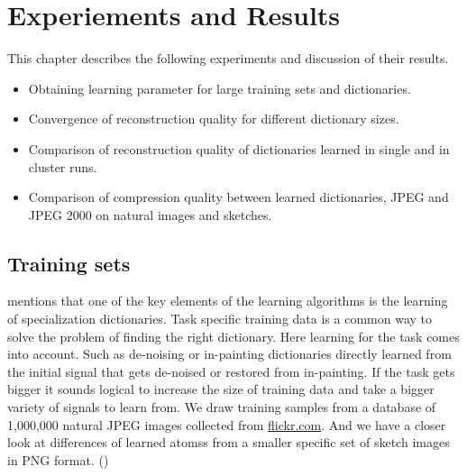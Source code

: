 \chapter{Experiements and Results}

This chapter describes the following experiments and discussion of their
results.
\begin{itemize}
 \item Obtaining learning parameter for large training sets and dictionaries.
 \item Convergence of reconstruction quality for different dictionary sizes.
 \item Comparison of reconstruction quality of dictionaries
learned in single and in cluster runs. 
 \item Comparison of compression quality between learned dictionaries, JPEG
and JPEG 2000 on natural images and sketches.
\end{itemize}

\section{Training sets}
 mentions that one of the key
elements of the learning algorithms is the learning of specialization
dictionaries. Task specific training data is a common way to solve the problem
of finding the right dictionary. Here learning for the task comes into
account. Such as de-noising or in-painting dictionaries directly learned from
the initial signal that gets de-noised or restored from in-painting. If the task
gets bigger it sounds logical to increase the size of training data and take a
bigger variety of signals to learn from.  We draw training samples from a
database of 1,000,000 natural JPEG images collected from \url{flickr.com}. And
we have a closer look at differences of learned atomss from a smaller specific
set of sketch images in PNG format. ()

